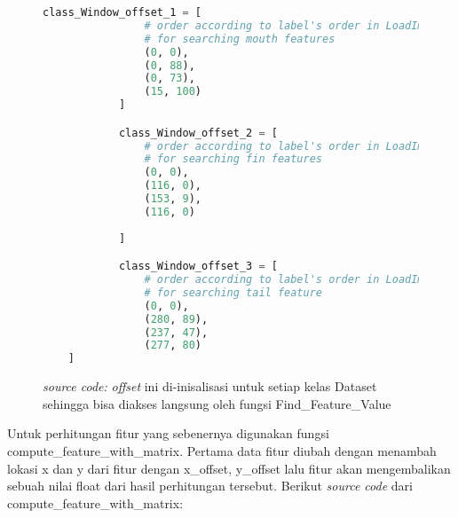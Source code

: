 	\begin{figure}[H]
		\begin{lstlisting}[language=Python, basicstyle=\tiny]
			class_Window_offset_1 = [
				# order according to label's order in LoadImages
				# for searching mouth features
				(0, 0),
				(0, 88),
				(0, 73),
				(15, 100)
			]

			class_Window_offset_2 = [
				# order according to label's order in LoadImages
				# for searching fin features
				(0, 0),
				(116, 0),
				(153, 9),
				(116, 0)
    
			]

			class_Window_offset_3 = [
				# order according to label's order in LoadImages
				# for searching tail feature
				(0, 0),
				(280, 89),
				(237, 47),
				(277, 80)
    ]
		\end{lstlisting}
		\caption{\emph{source code:} \textit{offset} ini di-inisalisasi untuk setiap kelas Dataset 
		sehingga bisa diakses langsung oleh fungsi Find\_Feature\_Value}
		\label{code:Training sub-window offset}
	\end{figure}

	Untuk perhitungan fitur yang sebenernya digunakan fungsi compute\_feature\_with\_matrix. 
	Pertama data fitur diubah dengan menambah lokasi x dan y dari fitur dengan x\_offset, y\_offset 
	lalu fitur akan mengembalikan sebuah nilai float dari hasil perhitungan tersebut. Berikut \emph{source code} 
	dari compute\_feature\_with\_matrix:
	
